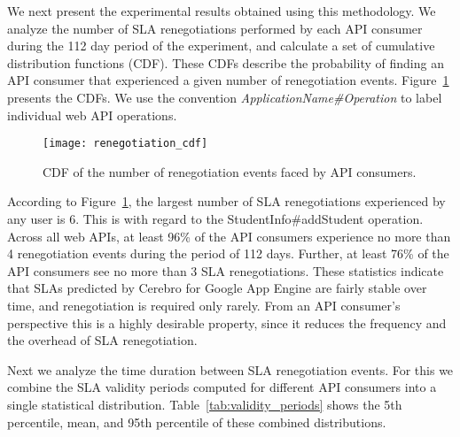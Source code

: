 We next present the experimental results obtained using this methodology. We
analyze the number of SLA renegotiations performed by each API consumer during the 112 day
period of the experiment, and calculate a set of cumulative distribution functions (CDF). These
CDFs describe the probability of finding an API consumer that experienced a given number of
renegotiation events. Figure~\ref{fig:renegotiation_cdf} presents the CDFs. We use the convention
\textit{ApplicationName\#Operation} to label individual web API operations.

\begin{figure}
\centering
\texttt{[image: renegotiation\_cdf]}
\caption{CDF of the number of renegotiation events faced by API consumers.}
\label{fig:renegotiation_cdf}
\vspace{-0.1in}
\end{figure}

According to Figure~\ref{fig:renegotiation_cdf}, the largest number of SLA renegotiations 
experienced by any user is 6. This is
with regard to the StudentInfo\#addStudent operation. Across all web APIs, at least 96\% of the API
consumers experience no more than 4 renegotiation events during the period of 112 days. Further,
at least 76\% of the API consumers see no more than 3 SLA renegotiations. These statistics
indicate that SLAs predicted by Cerebro for Google App Engine are fairly
stable over time, and renegotiation is required only rarely. From an API consumer's perspective
this is a highly desirable property, since it reduces the frequency and the 
overhead of SLA renegotiation.

Next we analyze the time duration between SLA renegotiation events. For this we combine the SLA validity
periods computed for different API consumers into a single statistical distribution. 
Table~\ref{tab:validity_periods} shows the 5th percentile, mean, and 95th percentile 
of these combined distributions. 

